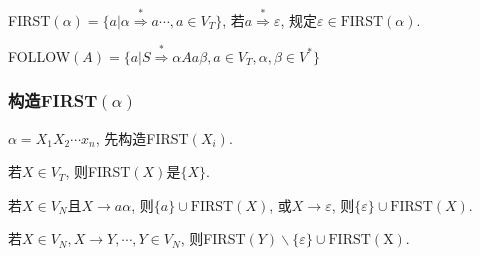                 FIRST$(\alpha)=\{a|\alpha\stackrel{*}{\Rightarrow}a\cdots, a\in V_T\}$, 若$a\stackrel{*}{\Rightarrow}\varepsilon$, 规定$\varepsilon\in\mathrm{FIRST}(\alpha)$.

                FOLLOW$(A)=\{a|S\stackrel{*}{\Rightarrow}\alpha Aa\beta, a\in V_T, \alpha, \beta\in V^*\}$

            \subsubsection{构造FIRST$(\alpha)$}

                $\alpha=X_1X_2\cdots x_n$, 先构造FIRST$(X_i)$. 

                若$X\in V_T$, 则FIRST$(X)$是$\{X\}$. 
                
                若$X\in V_N$且$X\to a\alpha$, 则$\{a\}\cup \mathrm{FIRST}(X)$, 或$X\to \varepsilon$, 则$\{\varepsilon\}\cup \mathrm{FIRST}(X)$. 
                
                若$X\in V_N, X\to Y,\cdots, Y\in V_N$, 则FIRST$(Y)\backslash\{\varepsilon\}\cup \mathrm{FIRST(X)}$.

